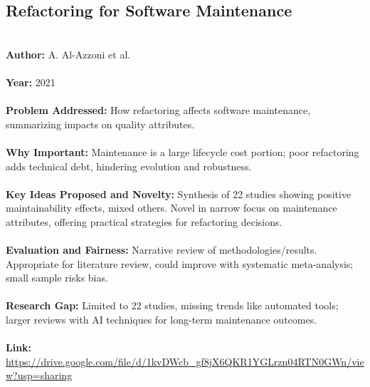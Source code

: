 \documentclass[12pt]{article}
\begin{document}
\subsection*{Refactoring for Software Maintenance}
\\
\textbf{Author:} A. Al-Azzoni et al. \\
\\
\textbf{Year:} 2021 \\
\\
\textbf{Problem Addressed:} How refactoring affects software maintenance, summarizing impacts on quality attributes. \\
\\
\textbf{Why Important:} Maintenance is a large lifecycle cost portion; poor refactoring adds technical debt, hindering evolution and robustness. \\
\\
\textbf{Key Ideas Proposed and Novelty:} Synthesis of 22 studies showing positive maintainability effects, mixed others. Novel in narrow focus on maintenance attributes, offering practical strategies for refactoring decisions. \\
\\
\textbf{Evaluation and Fairness:} Narrative review of methodologies/results. Appropriate for literature review, could improve with systematic meta-analysis; small sample risks bias. \\
\\
\textbf{Research Gap:} Limited to 22 studies, missing trends like automated tools; larger reviews with AI techniques for long-term maintenance outcomes. \\
\\
\textbf{Link:} \url{https://drive.google.com/file/d/1kvDWcb_gf8jX6QKR1YGLrzn04RTN0GWn/view?usp=sharing}
\pagebreak

\end{document}
